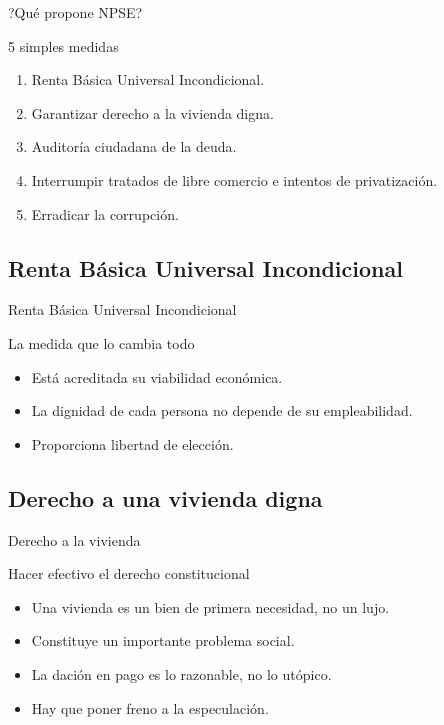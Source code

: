 \documentclass{beamer}
\begin{document}
\begin{frame}{?Qu\'e propone NPSE?}
  \begin{alertblock}{5 simples medidas}
  \begin{enumerate}
    \item Renta B\'asica Universal Incondicional.
    \item Garantizar derecho a la vivienda digna.
    \item Auditor\'i{a} ciudadana de la deuda.
    \item Interrumpir tratados de libre comercio e intentos de privatizaci\'on.
    \item Erradicar la corrupci\'on.
  \end{enumerate}
  \end{alertblock}
\end{frame}

\subsection{Renta B\'asica Universal Incondicional}

\begin{frame}{Renta B\'asica Universal Incondicional}
  \begin{block}{La medida que lo cambia todo}
  \begin{itemize}
    \item Est\'a acreditada su viabilidad econ\'omica.
    \item La dignidad de cada persona no depende de su empleabilidad.
    \item Proporciona libertad de elecci\'on.
  \end{itemize}
  \end{block}
\end{frame}

\subsection{Derecho a una vivienda digna}

\begin{frame}{Derecho a la vivienda}
  \begin{block}{Hacer efectivo el derecho constitucional}
  \begin{itemize}
    \item Una vivienda es un bien de primera necesidad, no un lujo.
    \item Constituye un importante problema social.
    \item La daci\'on en pago es lo razonable, no lo ut\'opico.
    \item Hay que poner freno a la especulaci\'on.
  \end{itemize}
  \end{block}
\end{frame}
\end{document}
